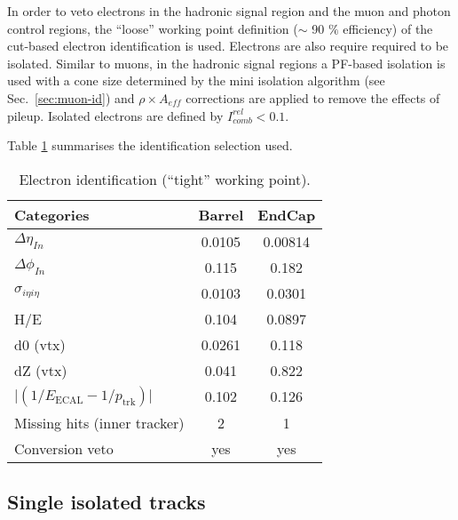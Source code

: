 In order to veto electrons in the hadronic signal region and the muon
and photon control regions, the ``loose'' working point definition
($\sim$ 90 $\%$ efficiency) of the cut-based electron identification
\cite{electron-id} is used.  Electrons are also require required to be
isolated.  Similar to muons, in the hadronic signal regions a PF-based
isolation \cite{pf-photon} is used with a cone size determined by the
mini isolation algorithm (see Sec.~\ref{sec:muon-id}) and $\rho\times
A_{eff}$ corrections are applied to remove the effects of pileup.
Isolated electrons are defined by $I^{rel}_{comb} < 0.1$.

Table \ref{tab:ele-id} summarises the identification 
selection used. 

\begin{table}[h!]
  \caption{Electron identification (``tight'' working point).\label{tab:ele-id}}
  \centering
  \footnotesize
  \begin{tabular}{ lcc }
    \hline
    \hline
    Categories                                               & Barrel    & EndCap    \\
    \hline
    $\Delta \eta_{In}$                                       & 0.0105   & 0.00814  \\
    $\Delta \phi_{In}$                                       & 0.115    & 0.182  \\
    $\sigma_{i\eta i\eta}$                                   & 0.0103    & 0.0301  \\
    H/E                                                      & 0.104    & 0.0897   \\
    d0 (vtx)                                                 & 0.0261    & 0.118  \\
    dZ (vtx)                                                 & 0.041    & 0.822  \\
    $\lvert(1/E_{\textrm{ECAL}} - 1/p_{\textrm{trk}})\rvert$ & 0.102     & 0.126  \\
    Missing hits (inner tracker)                             & 2         & 1         \\
    Conversion veto                                          & yes       & yes   \\
    \hline
    \hline
  \end{tabular}
  \end{table}

\subsection{Single isolated tracks}
\label{sec:SIT}

